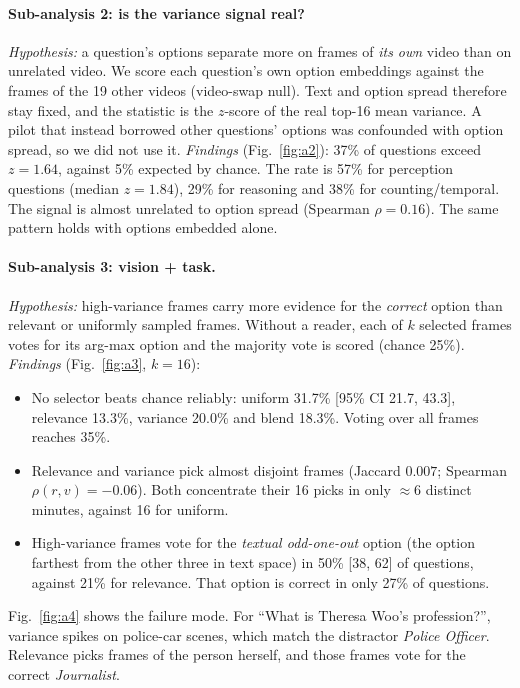 \paragraph{Sub-analysis 2: is the variance signal real?}
\emph{Hypothesis:} a question's options separate more on frames of \emph{its own} video than
on unrelated video. We score each question's own option embeddings against the frames of
the 19 other videos (video-swap null). Text and option spread therefore stay fixed, and the
statistic is the $z$-score of the real top-16 mean variance. A pilot that instead borrowed
other questions' options was confounded with option spread, so we did not use it.
\emph{Findings} (Fig.~\ref{fig:a2}): 37\% of questions exceed $z{=}1.64$, against 5\% expected
by chance. The rate is 57\% for perception questions (median $z{=}1.84$), 29\% for reasoning
and 38\% for counting/temporal. The signal is almost unrelated to option spread
(Spearman $\rho{=}0.16$). The same pattern holds with options embedded alone.

\paragraph{Sub-analysis 3: vision + task.}
\emph{Hypothesis:} high-variance frames carry more evidence for the \emph{correct} option than
relevant or uniformly sampled frames. Without a reader, each of $k$ selected frames votes for
its arg-max option and the majority vote is scored (chance 25\%).
\emph{Findings} (Fig.~\ref{fig:a3}, $k{=}16$):
\begin{itemize}
  \item No selector beats chance reliably: uniform 31.7\% [95\% CI 21.7, 43.3], relevance 13.3\%,
        variance 20.0\% and blend 18.3\%. Voting over all frames reaches 35\%.
  \item Relevance and variance pick almost disjoint frames (Jaccard $0.007$; Spearman $\rho(r,v){=}-0.06$).
        Both concentrate their 16 picks in only $\approx$6 distinct minutes, against 16 for uniform.
  \item High-variance frames vote for the \emph{textual odd-one-out} option (the option farthest
        from the other three in text space) in 50\% [38, 62] of questions, against 21\% for
        relevance. That option is correct in only 27\% of questions.
\end{itemize}
Fig.~\ref{fig:a4} shows the failure mode. For ``What is Theresa Woo's profession?'', variance
spikes on police-car scenes, which match the distractor \emph{Police Officer}. Relevance
picks frames of the person herself, and those frames vote for the correct \emph{Journalist}.

